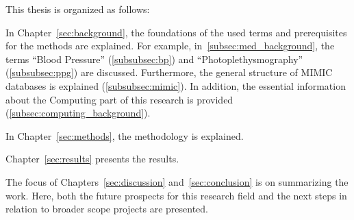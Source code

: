 This thesis is organized as follows:

In Chapter~\ref{sec:background}, the foundations of the used terms and prerequisites for the methods are explained.
For example, in~\ref{subsec:med_background}, the terms \enquote{Blood Pressure} (\ref{subsubsec:bp}) and \enquote{Photoplethysmography} (\ref{subsubsec:ppg}) are discussed.
Furthermore, the general structure of MIMIC databases is explained (\ref{subsubsec:mimic}). In addition, the essential information about the Computing part of this research is provided (\ref{subsec:computing_background}).

In Chapter~\ref{sec:methods}, the methodology is explained.

Chapter~\ref{sec:results} presents the results.

The focus of Chapters~\ref{sec:discussion} and~\ref{sec:conclusion} is on summarizing the work.
Here, both the future prospects for this research field and the next steps in relation to broader scope projects are presented.